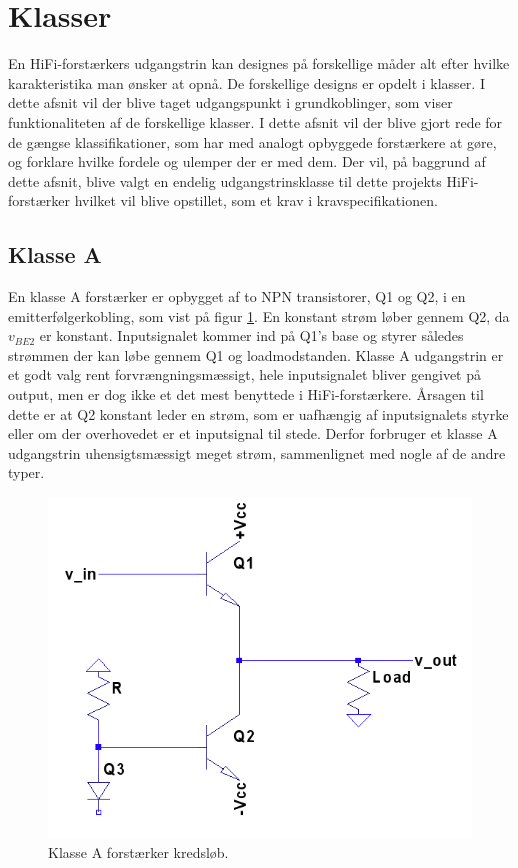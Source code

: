 \section{Klasser}
En HiFi-forstærkers udgangstrin kan designes på forskellige måder alt efter hvilke karakteristika man ønsker at opnå. De forskellige designs er opdelt i klasser. I dette afsnit vil der blive taget udgangspunkt i grundkoblinger, som viser funktionaliteten af de forskellige klasser. 
I dette afsnit vil der blive gjort rede for de gængse klassifikationer, som har med analogt opbyggede forstærkere at gøre, og forklare hvilke fordele og ulemper der er med dem. Der vil, på baggrund af dette afsnit, blive valgt en endelig udgangstrinsklasse til dette projekts HiFi-forstærker hvilket vil blive opstillet, som et krav i kravspecifikationen.

\subsection{Klasse A}

En klasse A forstærker er opbygget af to NPN transistorer, Q1 og Q2, i en emitterfølgerkobling, som vist på figur \ref{fig:classa}. En konstant strøm løber gennem Q2, da $v_{BE2}$ er konstant. Inputsignalet kommer ind på Q1's base og styrer således strømmen der kan løbe gennem Q1 og loadmodstanden. 
Klasse A udgangstrin er et godt valg rent forvrængningsmæssigt, hele inputsignalet bliver gengivet på output, men er dog ikke et det mest benyttede i HiFi-forstærkere. Årsagen til dette er at Q2 konstant leder en strøm, som er uafhængig af inputsignalets styrke eller om der overhovedet er et inputsignal til stede. Derfor forbruger et klasse A udgangstrin uhensigtsmæssigt meget strøm, sammenlignet med nogle af de andre typer. 

\begin{figure}[h]
\centering
\includegraphics[scale=.35]{indledende_analyse/klasser/classa.png}
\caption{Klasse A forstærker kredsløb.}
\label{fig:classa}
\end{figure}


